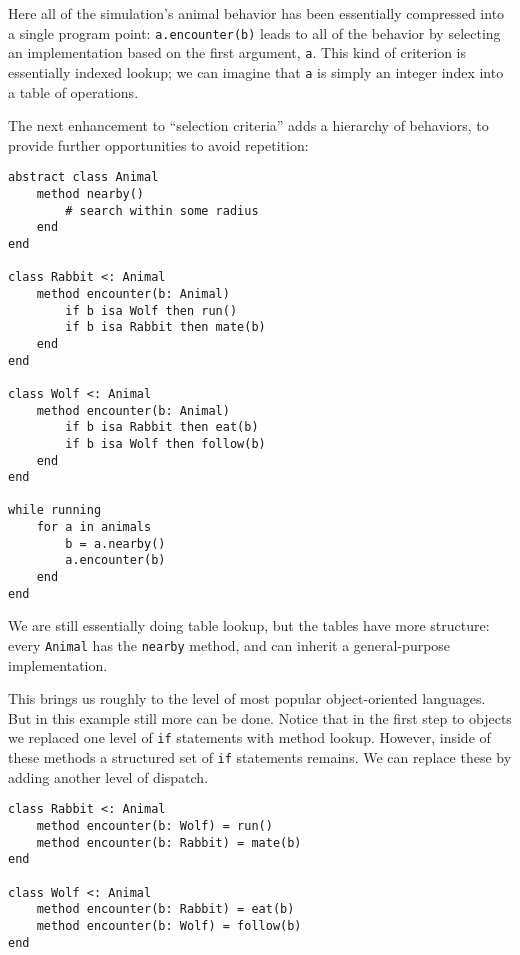 Here all of the simulation's animal behavior has been essentially
compressed into a single program point: \texttt{a.encounter(b)}
leads to all of the behavior by selecting an implementation based
on the first argument, \texttt{a}. This kind of criterion is
essentially indexed lookup; we can imagine that \texttt{a} is
simply an integer index into a table of operations.

The next enhancement to ``selection criteria'' adds a hierarchy
of behaviors, to provide further opportunities to avoid
repetition:


\begin{singlespace}
\begin{verbatim}
abstract class Animal
    method nearby()
        # search within some radius
    end
end

class Rabbit <: Animal
    method encounter(b: Animal)
        if b isa Wolf then run()
        if b isa Rabbit then mate(b)
    end
end

class Wolf <: Animal
    method encounter(b: Animal)
        if b isa Rabbit then eat(b)
        if b isa Wolf then follow(b)
    end
end

while running
    for a in animals
        b = a.nearby()
        a.encounter(b)
    end
end
\end{verbatim}
\end{singlespace}

We are still essentially doing table lookup, but the tables have
more structure: every \texttt{Animal} has the \texttt{nearby}
method, and can inherit a general-purpose implementation.

This brings us roughly to the level of most popular object-oriented
languages. But in this example still more can be done. Notice that
in the first step to objects we replaced one level of \texttt{if}
statements with method lookup. However, inside of these methods
a structured set of \texttt{if} statements remains. We can
replace these by adding another level of dispatch.

\begin{singlespace}
\begin{verbatim}
class Rabbit <: Animal
    method encounter(b: Wolf) = run()
    method encounter(b: Rabbit) = mate(b)
end

class Wolf <: Animal
    method encounter(b: Rabbit) = eat(b)
    method encounter(b: Wolf) = follow(b)
end
\end{verbatim}
\end{singlespace}

